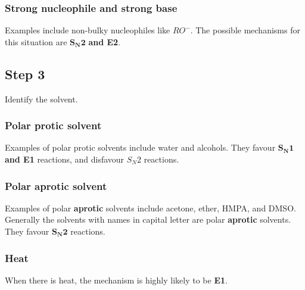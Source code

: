 \documentclass[11pt]{article}
\begin{document}
\subsubsection{Strong nucleophile and strong base}
\label{sec:org9af6bdc}
Examples include non-bulky nucleophiles like \(RO^-\). The possible mechanisms for this situation are \(\boldsymbol{S_N 2}\) \textbf{and E2}.
\subsection{Step 3}
\label{sec:org3e0fee3}
Identify the solvent.
\subsubsection{Polar protic solvent}
\label{sec:org3ac1164}
Examples of polar protic solvents include water and alcohols. They favour \(\boldsymbol{S_N 1}\) \textbf{and E1} reactions, and disfavour \(S_N 2\) reactions.
\subsubsection{Polar aprotic solvent}
\label{sec:org98d57de}
Examples of polar \textbf{aprotic} solvents include acetone, ether, HMPA, and DMSO. Generally the solvents with names in capital letter are polar \textbf{aprotic} solvents. They favour \(\boldsymbol{S_N 2}\) reactions.
\subsubsection{Heat}
\label{sec:org7efd3cf}
When there is heat, the mechanism is highly likely to be \textbf{E1}.
\end{document}
